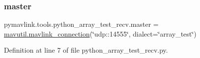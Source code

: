 \subsubsection{\texorpdfstring{master}{master}}
{\footnotesize\ttfamily pymavlink.\+tools.\+python\+\_\+array\+\_\+test\+\_\+recv.\+master = \mbox{\hyperlink{namespacepymavlink_1_1mavutil_aa6c4b8861f86ef3bb746fa0fab241c93}{mavutil.\+mavlink\+\_\+connection}}(\char`\"{}udp\+::14555\char`\"{}, dialect=\char`\"{}array\+\_\+test\char`\"{})}



Definition at line 7 of file python\+\_\+array\+\_\+test\+\_\+recv.\+py.

